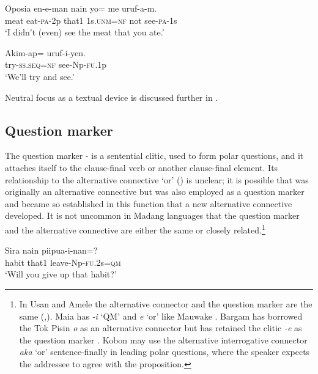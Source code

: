 \ea%
\label{ex:3:x787}
\gll Oposia en-e-man nain yo= me uruf-a-m. \\
meat eat-\textsc{pa}-2p that1 1s.\textsc{unm}=\textsc{nf} not see-\textsc{pa}-1s\\
\glt`I didn't (even) see the meat that you ate.'
\z

\ea%
\label{ex:3:x788}
\gll Akim-ap= uruf-i-yen. \\
try-\textsc{ss}.\textsc{seq}=\textsc{nf} see-Np-\textsc{fu}.1p\\
\glt`We'll try and see.'
\z

Neutral focus as a textual device is discussed further in .

\subsection{Question marker}\label{sec:3:y:x}
{}
The question marker - is a sentential clitic, used to form polar questions, and it attaches itself to the clause-final verb or another clause-final element. Its relationship to the alternative connective  `or' () is unclear; it is possible that  was originally an alternative connective but was also employed as a question marker and became so established in this function that a new alternative connective  developed. It is not uncommon in  Madang languages that the question marker and the alternative connective are either the same or closely related.\footnote{In Usan and Amele the alternative connector and the question marker are the same (\citealt[293]{Reesink1987},\citealt[99]{Roberts1987}). Maia has \textit{-i} `QM' and \textit{e} `or' like Mauwake \citep[83,159]{Hardin2002}. Bargam has borrowed the Tok Pisin \textit{o} as an alternative connector but has retained the clitic \textit{-e} as the question marker \citep[53,122]{Hepner2002}. Kobon may use the alternative interrogative connector \textit{aka} `or' sentence-finally in leading polar questions, where the speaker expects the addressee to agree with the proposition. } 

\ea%
\label{ex:3:x789}
\gll Sira nain piipua-i-nan=? \\
habit that1 leave-Np-\textsc{fu}.2s=\textsc{qm}\\
\glt`Will you give up that habit?'
\z

